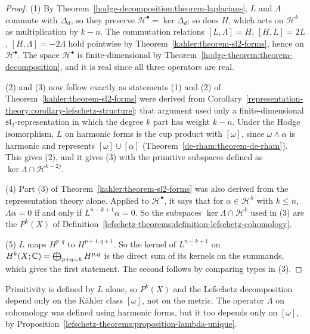 \begin{proof}
(1) By Theorem~\ref{hodge-decomposition:theorem-laplacians}, $L$ and $\Lambda$ commute with $\Delta_d$, so they preserve
$\mathcal{H}^\bullet = \ker\Delta_d$; so does $H$, which acts on $\mathcal{H}^k$ as multiplication by $k - n$. The commutation relations
$[L, \Lambda] = H$, $[H, L] = 2L$, $[H, \Lambda] = -2\Lambda$ hold pointwise by Theorem~\ref{kahler:theorem-sl2-forms}, hence on
$\mathcal{H}^\bullet$. The space $\mathcal{H}^\bullet$ is finite-dimensional by Theorem~\ref{hodge-theorem:theorem-decomposition}, and it
is real since all three operators are real.

(2) and (3) now follow exactly as statements (1) and (2) of Theorem~\ref{kahler:theorem-sl2-forms} were derived from
Corollary~\ref{representation-theory:corollary-lefschetz-structure}: that argument used only a finite-dimensional
$\mathfrak{sl}_2$-representation in which the degree $k$ part has weight $k - n$. Under the Hodge isomorphism, $L$ on harmonic forms
is the cup product with $[\omega]$, since $\omega \wedge \alpha$ is harmonic and represents $[\omega] \cup [\alpha]$
(Theorem~\ref{de-rham:theorem-de-rham}). This gives (2), and it gives (3) with the primitive subspaces defined as
$\ker\Lambda \cap \mathcal{H}^{k-2j}$.

(4) Part (3) of Theorem~\ref{kahler:theorem-sl2-forms} was also derived from the representation theory alone. Applied to
$\mathcal{H}^\bullet$, it says that for $\alpha \in \mathcal{H}^k$ with $k \leq n$, $\Lambda\alpha = 0$ if and only if
$L^{n-k+1}\alpha = 0$. So the subspaces $\ker\Lambda \cap \mathcal{H}^k$ used in (3) are the $P^k(X)$ of
Definition~\ref{lefschetz-theorems:definition-lefschetz-cohomology}.

(5) $L$ maps $H^{p,q}$ to $H^{p+1,q+1}$. So the kernel of $L^{n-k+1}$ on $H^k(X; \mathbb{C}) = \bigoplus_{p+q=k}H^{p,q}$ is the direct sum of
its kernels on the summands, which gives the first statement. The second follows by comparing types in (3).
\end{proof}

\begin{remark}\label{lefschetz-theorems:remark-metric-independence}
Primitivity is defined by $L$ alone, so $P^k(X)$ and the Lefschetz decomposition depend only on the K\"ahler class $[\omega]$, not on the
metric. The operator $\Lambda$ on cohomology was defined using harmonic forms, but it too depends only on $[\omega]$, by
Proposition~\ref{lefschetz-theorems:proposition-lambda-unique}.
\end{remark}

